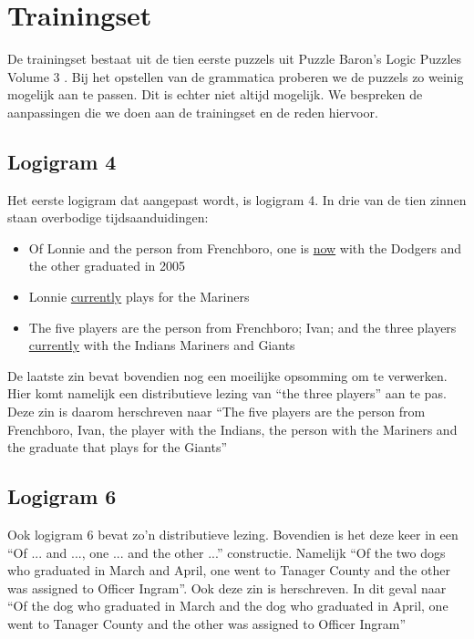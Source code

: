 \section{Trainingset}
De trainingset bestaat uit de tien eerste puzzels uit Puzzle Baron's Logic Puzzles Volume 3 \cite{logigrammen}. Bij het opstellen van de grammatica proberen we de puzzels zo weinig mogelijk aan te passen. Dit is echter niet altijd mogelijk. We bespreken de aanpassingen die we doen aan de trainingset en de reden hiervoor.

\subsection{Logigram 4}
Het eerste logigram dat aangepast wordt, is logigram 4. In drie van de tien zinnen staan overbodige tijdsaanduidingen:

\begin{itemize}
  \item Of Lonnie and the person from Frenchboro, one is \underline{now} with the Dodgers and the other graduated in 2005
  \item Lonnie \underline{currently} plays for the Mariners
  \item The five players are the person from Frenchboro; Ivan; and the three players \underline{currently} with the Indians Mariners and Giants
\end{itemize}

De laatste zin bevat bovendien nog een moeilijke opsomming om te verwerken. Hier komt namelijk een distributieve lezing van ``the three players'' aan te pas. Deze zin is daarom herschreven naar ``The five players are the person from Frenchboro, Ivan, the player with the Indians, the person with the Mariners and the graduate that plays for the Giants'' 

\subsection{Logigram 6}
Ook logigram 6 bevat zo'n distributieve lezing. Bovendien is het deze keer in een ``Of ... and ..., one ... and the other ...'' constructie. Namelijk ``Of the two dogs who graduated in March and April, one went to Tanager County and the other was assigned to Officer Ingram''. Ook deze zin is herschreven. In dit geval naar ``Of the dog who graduated in March and the dog who graduated in April, one went to Tanager County and the other was assigned to Officer Ingram''

